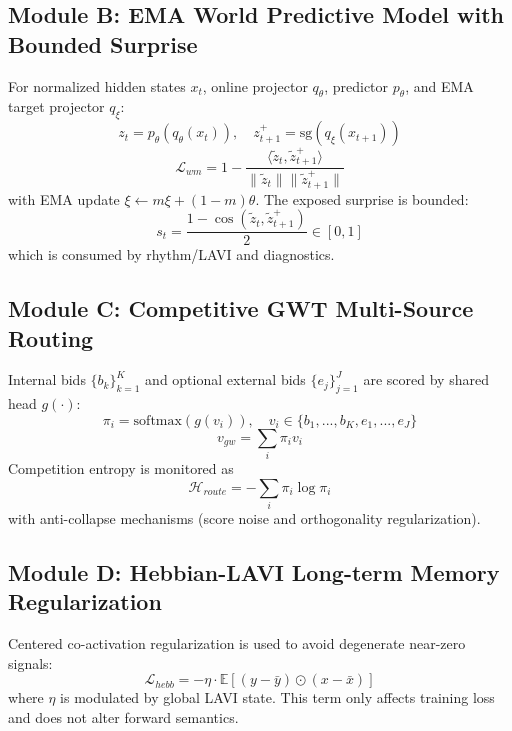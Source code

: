 \documentclass[10pt,twocolumn]{article}
\begin{document}
\subsection{Module B: EMA World Predictive Model with Bounded Surprise}
For normalized hidden states $x_t$, online projector $q_\theta$, predictor $p_\theta$, and EMA target projector $q_{\xi}$:
\begin{equation}
z_t = p_\theta(q_\theta(x_t)),\quad z^+_{t+1}=\text{sg}(q_{\xi}(x_{t+1}))
\end{equation}
\begin{equation}
\mathcal{L}_{wm} = 1 - \frac{\langle \tilde{z}_t,\tilde{z}^+_{t+1}\rangle}{\lVert \tilde{z}_t\rVert\lVert \tilde{z}^+_{t+1}\rVert}
\end{equation}
with EMA update $\xi\leftarrow m\xi + (1-m)\theta$. The exposed surprise is bounded:
\begin{equation}
s_t=\frac{1-\cos(\tilde{z}_t,\tilde{z}^+_{t+1})}{2}\in[0,1]
\end{equation}
which is consumed by rhythm/LAVI and diagnostics.

\subsection{Module C: Competitive GWT Multi-Source Routing}
Internal bids $\{b_k\}_{k=1}^{K}$ and optional external bids $\{e_j\}_{j=1}^{J}$ are scored by shared head $g(\cdot)$:
\begin{equation}
\pi_i = \text{softmax}(g(v_i)),\quad v_i\in\{b_1,...,b_K,e_1,...,e_J\}
\end{equation}
\begin{equation}
v_{gw} = \sum_i \pi_i v_i
\end{equation}
Competition entropy is monitored as
\begin{equation}
\mathcal{H}_{route} = -\sum_i \pi_i\log\pi_i
\end{equation}
with anti-collapse mechanisms (score noise and orthogonality regularization).

\subsection{Module D: Hebbian-LAVI Long-term Memory Regularization}
Centered co-activation regularization is used to avoid degenerate near-zero signals:
\begin{equation}
\mathcal{L}_{hebb} = -\eta\cdot\mathbb{E}[(y-\bar{y})\odot(x-\bar{x})]
\end{equation}
where $\eta$ is modulated by global LAVI state. This term only affects training loss and does not alter forward semantics.
\end{document}
